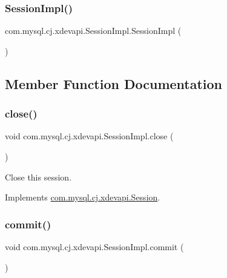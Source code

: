 \subsubsection{\texorpdfstring{Session\+Impl()}{SessionImpl()}\hspace{0.1cm}{\footnotesize\ttfamily [2/2]}}
{\footnotesize\ttfamily com.\+mysql.\+cj.\+xdevapi.\+Session\+Impl.\+Session\+Impl (\begin{DoxyParamCaption}{ }\end{DoxyParamCaption})\hspace{0.3cm}{\ttfamily [protected]}}



\subsection{Member Function Documentation}
\mbox{\label{classcom_1_1mysql_1_1cj_1_1xdevapi_1_1_session_impl_a84c222e009725cc3984f4edd56effec8}} 
\subsubsection{\texorpdfstring{close()}{close()}}
{\footnotesize\ttfamily void com.\+mysql.\+cj.\+xdevapi.\+Session\+Impl.\+close (\begin{DoxyParamCaption}{ }\end{DoxyParamCaption})}

Close this session. 

Implements \mbox{\hyperlink{interfacecom_1_1mysql_1_1cj_1_1xdevapi_1_1_session_a20f640c1ca28e28d415a1927cbd67ee5}{com.\+mysql.\+cj.\+xdevapi.\+Session}}.

\mbox{\label{classcom_1_1mysql_1_1cj_1_1xdevapi_1_1_session_impl_a63bd825fc3c1d7b27cd7294bef2c8a65}} 
\subsubsection{\texorpdfstring{commit()}{commit()}}
{\footnotesize\ttfamily void com.\+mysql.\+cj.\+xdevapi.\+Session\+Impl.\+commit (\begin{DoxyParamCaption}{ }\end{DoxyParamCaption})}

